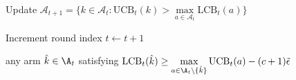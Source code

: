 \begin{algorithm}[!t]
\begin{algorithmic}[1]
            
            
            \State Update $\mathcal{A}_{t+1} =
            \big\{
            k \in \mathcal{A}_{t}:
            \mathrm{UCB}_t(k) >
            \max\limits_{a \in \mathcal{A}_{t}} 
            \mathrm{LCB}_t(a)
            \big\} 
            $
            \label{line: active arm}
            
             \State  Increment round index $t \leftarrow t+1$
             
            \label{line: end while loop}
        \EndWhile

        \State \Return any arm $\hat{k} \in \A_t$ 
        satisfying $\mathrm{LCB}_t(\hat{k})  \ge
                \max\limits_{a \in \A_t \setminus \{ \hat{k} \} }  
                \mathrm{UCB}_t(a) -  (c+1)\tilde{\epsilon}$ 
        \label{line: return}

    \end{algorithmic}
\end{algorithm}

